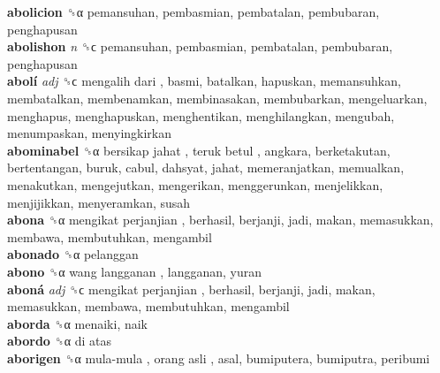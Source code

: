 \textbf{abolicion} ␝α  pemansuhan, pembasmian, pembatalan, pembubaran, penghapusan  \\
\textbf{abolishon} \emph{n}  ␝ϲ  pemansuhan, pembasmian, pembatalan, pembubaran, penghapusan  \\
\textbf{abolí} \emph{adj}  ␝ϲ   mengalih dari , basmi, batalkan, hapuskan, memansuhkan, membatalkan, membenamkan, membinasakan, membubarkan, mengeluarkan, menghapus, menghapuskan, menghentikan, menghilangkan, mengubah, menumpaskan, menyingkirkan  \\
\textbf{abominabel} ␝α   bersikap jahat ,  teruk betul , angkara, berketakutan, bertentangan, buruk, cabul, dahsyat, jahat, memeranjatkan, memualkan, menakutkan, mengejutkan, mengerikan, menggerunkan, menjelikkan, menjijikkan, menyeramkan, susah  \\
\textbf{abona} ␝α   mengikat perjanjian , berhasil, berjanji, jadi, makan, memasukkan, membawa, membutuhkan, mengambil  \\
\textbf{abonado} ␝α  pelanggan  \\
\textbf{abono} ␝α   wang langganan , langganan, yuran  \\
\textbf{aboná} \emph{adj}  ␝ϲ   mengikat perjanjian , berhasil, berjanji, jadi, makan, memasukkan, membawa, membutuhkan, mengambil  \\
\textbf{aborda} ␝α  menaiki, naik  \\
\textbf{abordo} ␝α   di atas   \\
\textbf{aborigen} ␝α   mula-mula ,  orang asli , asal, bumiputera, bumiputra, peribumi  \\
